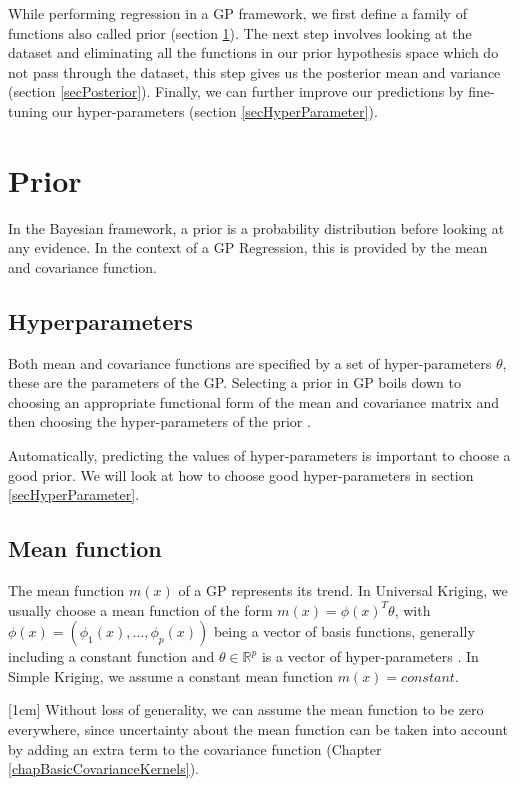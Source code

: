 While performing regression in a GP framework, we first define a family of functions also called prior (section \ref{secPrior}). The next step involves looking at the dataset and eliminating all the functions in our prior hypothesis space which do not pass through the dataset, this step gives us the posterior mean and variance (section \ref{secPosterior}). Finally, we can further improve our predictions by fine-tuning our hyper-parameters (section \ref{secHyperParameter}).

\section{Prior} \label{secPrior}
In the Bayesian framework, a prior is a probability distribution before looking at any evidence. In the context of a GP Regression, this is provided by the mean and covariance function. 

\subsection{Hyperparameters}
Both mean and covariance functions are specified by a set of hyper-parameters $\theta$, these are the parameters of the GP. Selecting a prior in GP boils down to choosing an appropriate functional form of the mean and covariance matrix and then choosing the hyper-parameters of the prior \cite{rasmussen2006gaussian}. 

Automatically, predicting the values of hyper-parameters is important to choose a good prior. We will look at how to choose good hyper-parameters in section \ref{secHyperParameter}. 

\subsection{Mean function}\label{subSecCH2MeanFunction}
The mean function $m(x)$ of a GP represents its trend. In Universal Kriging, we usually choose a mean function of the form $m(x) = \phi(x)^{T}\theta$, with $\phi(x) = (\phi_{1}(x), \ldots , \phi_{p}(x))$ being a vector of basis functions, generally including a constant function and $\theta \in \mathbb{R}^{p}$ is a vector of hyper-parameters \cite{matheron1963principles}. In Simple Kriging, we assume a constant mean function $m(x) = constant$.

[1cm]
Without loss of generality, we can assume the mean function to be zero everywhere, since uncertainty about the mean function can be taken into account by adding an extra term to the covariance function (Chapter \ref{chapBasicCovarianceKernels}).  

